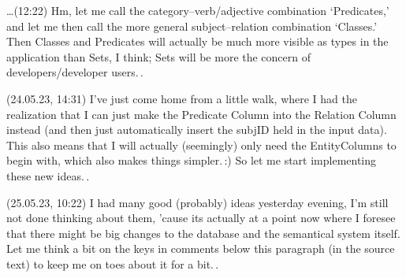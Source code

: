\documentclass{report}
\begin{document}
\ldots (12:22) Hm, let me call the category--verb/adjective combination `Predicates,' and let me then call the more general subject--relation combination `Classes.' Then Classes and Predicates will actually be much more visible as types in the application than Sets, I think; Sets will be more the concern of developers/developer users.\,.

(24.05.23, 14:31) I've just come home from a little walk, where I had the realization that I can just make the Predicate Column into the Relation Column instead (and then just automatically insert the subjID held in the input data). This also means that I will actually (seemingly) only need the EntityColumns to begin with, which also makes things simpler.\,:) So let me start implementing these new ideas.\,.


(25.05.23, 10:22) I had many good (probably) ideas yesterday evening, I'm still not done thinking about them, 'cause its actually at a point now where I foresee that there might be big changes to the database and the semantical system itself. Let me think a bit on the keys in comments below this paragraph (in the source text) to keep me on toes about it for a bit.\,.
\end{document}
